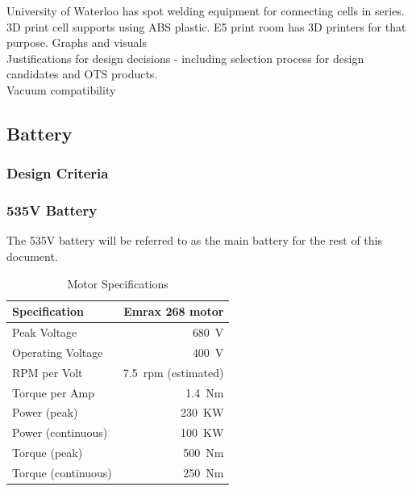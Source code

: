 \documentclass{report}
\begin{document}
    
    University of Waterloo has spot welding equipment for connecting cells in series.
    3D print cell supports using ABS plastic. E5 print room has 3D printers for that purpose.
    Graphs and visuals\\
    
    Justifications for design decisions - including selection process for design candidates and OTS products.\\
    
    Vacuum compatibility\\
    
    \subsection{Battery}
    \subsubsection{Design Criteria}
    \subsubsection{535V Battery}
    The 535V battery will be referred to as the main battery for the rest of this document.\\
    
    \begin{table}[H]
        \centering
        \begin{tabular}{@{}lr@{}} \toprule
            Specification & Emrax 268 motor\\ \midrule
            Peak Voltage & \SI{680}{V}\\
            Operating Voltage & \SI{400}{V}\\
            RPM per Volt & \SI{7.5}{rpm} (estimated)\\
            Torque per Amp & \SI{1.4}{Nm}\\
            Power (peak) & \SI{230}{KW}\\
            Power (continuous) & \SI{100}{KW}\\
            Torque (peak) & \SI{500}{Nm}\\
            Torque (continuous) & \SI{250}{Nm}\\ \bottomrule
        \end{tabular}
        \caption{Motor Specifications}
    \end{table}
    
\end{document}
